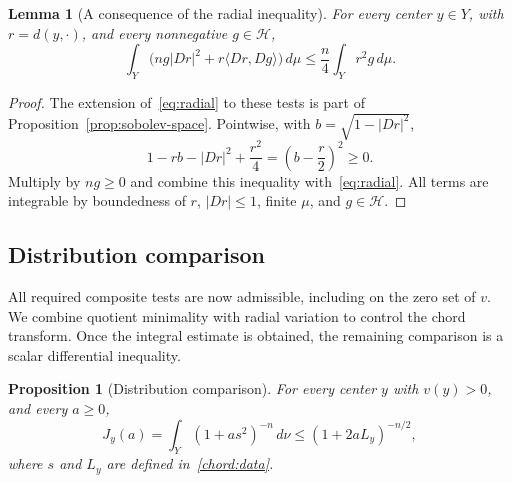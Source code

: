 \documentclass[11pt]{article}
\numberwithin{equation}{section}
\newtheorem{proposition}[theorem]{Proposition}
\newtheorem{lemma}[theorem]{Lemma}
\theoremstyle{definition}
\theoremstyle{remark}
\begin{document}
\begin{lemma}[A consequence of the radial inequality]
\label{lem:completed-radial}
For every center $y\in Y$, with $r=d(y,\cdot)$, and every
nonnegative $g\in\mathcal H$,
\begin{equation}\label{chord:completed-radial}
 \int_Y\bigl(ng\lvert Dr\rvert^2+r\langle Dr,Dg\rangle\bigr)\,d\mu
       \le\frac n4\int_Y r^2g\,d\mu.
\end{equation}
\end{lemma}

\begin{proof}
The extension of~\eqref{eq:radial} to these tests is part of
Proposition~\ref{prop:sobolev-space}. Pointwise, with
$b=\sqrt{1-\lvert Dr\rvert^2}$,
\[
 1-rb-\lvert Dr\rvert^2+\frac{r^2}{4}
                   =\left(b-\frac r2\right)^2\ge0.
\]
Multiply by $ng\ge0$ and combine this inequality
with~\eqref{eq:radial}. All terms are integrable by boundedness
of $r$, $\lvert Dr\rvert\le1$, finite $\mu$, and $g\in\mathcal H$.
\end{proof}

\subsection{Distribution comparison}

All required composite tests are now admissible, including on the zero
set of $v$. We combine quotient minimality with radial variation to
control the chord transform. Once the integral estimate is obtained,
the remaining comparison is a scalar differential inequality.

\begin{proposition}[Distribution comparison]\label{prop:chord-transform}
For every center $y$ with $v(y)>0$, and every $a\ge0$,
\begin{equation}\label{eq:chord-transform}
 J_y(a)=\int_Y(1+as^2)^{-n}\,d\nu
                  \le(1+2aL_y)^{-n/2},
\end{equation}
where $s$ and $L_y$ are defined in~\eqref{chord:data}.
\end{proposition}
\end{document}
